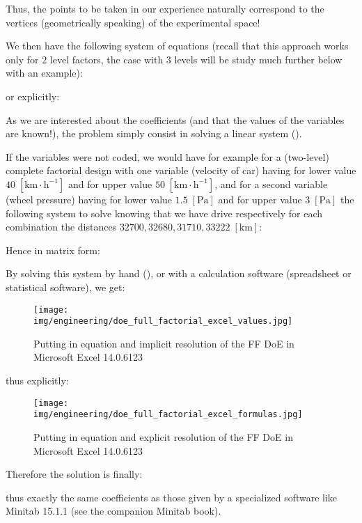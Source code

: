 	Thus, the points to be taken in our experience naturally correspond to the vertices (geometrically speaking) of the experimental space!
	
	We then have the following system of equations (recall that this approach works only for $2$ level factors, the case with $3$ levels will be study much further below with an example):
	
	or explicitly:
	
	As we are interested about the coefficients (and that the values of the variables are known!), the problem simply consist in solving a linear system ().
	
	If the variables were not coded, we would have for example for a (two-level) complete factorial design with one variable (velocity of car) having for lower value $40 \;[\text{km}\cdot\text{h}^{-1}]$ and for upper value  $50 \;[\text{km}\cdot\text{h}^{-1}]$, and for a second variable (wheel pressure) having for lower value $1.5\;[\text{Pa}]$ and for upper value $3\;[\text{Pa}]$ the following system to solve knowing that we have drive respectively for each combination the distances $32700, 32680, 31710, 33222\;[\text{km}]$:
	
	Hence in matrix form:
	
	By solving this system by hand (), or with a calculation software (spreadsheet or statistical software), we get:
	\begin{figure}[H]
		\begin{center}
		\texttt{[image: img/engineering/doe\_full\_factorial\_excel\_values.jpg]}
		\end{center}	
		\caption[]{Putting in equation and implicit resolution of the FF DoE in Microsoft Excel 14.0.6123}
	\end{figure}
	thus explicitly:
	\begin{figure}[H]
		\begin{center}
		\texttt{[image: img/engineering/doe\_full\_factorial\_excel\_formulas.jpg]}
		\end{center}	
		\caption[]{Putting in equation and explicit resolution of the FF DoE in Microsoft Excel 14.0.6123}
	\end{figure}
	Therefore the solution is finally:
	
	thus exactly the same coefficients as those given by a specialized software like Minitab 15.1.1 (see the companion Minitab book).
	
